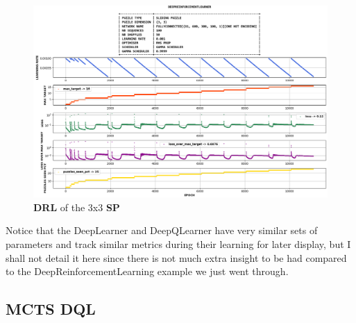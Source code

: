 \begin{figure}[H]
\centering
\includegraphics[align=c, scale=0.42]{./Figures/33SPDeepReinforcementLearning}
\caption[33SPDeepReinforcementLearning]{\textbf{DRL} of the 3x3 \textbf{SP}}
\label{fig:33SPDeepReinforcementLearning}
\end{figure}

Notice that the DeepLearner and DeepQLearner have very similar sets of parameters and track similar metrics during their learning for later display, but I shall not detail it here since there is not much extra insight to be had compared to the DeepReinforcementLearning example we just went through.



\subsection{MCTS DQL}
\label{sec:MTCSHyperParamsEffect}



